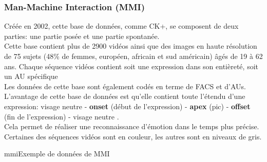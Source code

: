 \documentclass[overfullbox, poster]{polytech/polytech}
\begin{document}
\subsubsection{Man-Machine Interaction (MMI)  \cite{mmi1}\cite{mmi2}}
Créée en 2002, cette base de données, comme CK+, se composent de deux parties: une partie posée et une partie spontanée.\\
Cette base contient plus de 2900 vidéos ainsi que des images en haute résolution de 75 sujets (48\% de femmes, européen, africain et sud américain) âgés de 19 à 62 ans. Chaque séquence vidéos contient soit une expression dans son entièreté, soit un AU spécifique\\
Les données de cette base sont également codés en terme de FACS et d'AUs.\\
L'avantage de cette base de données est qu'elle contient toute l'étendu d'une expression: visage neutre - \textbf{onset} (début de l'expression) - \textbf{apex} (pic) - \textbf{offset} (fin de l'expression) - visage neutre .\\
Cela permet de réaliser une reconnaissance d'émotion dans le temps plus précise.\\
Certaines des séquences vidéos sont en couleur, les autres sont en niveaux de gris.

\begin{Figure}{mmi}{Exemple de données de MMI}
\end{Figure}
\end{document}

